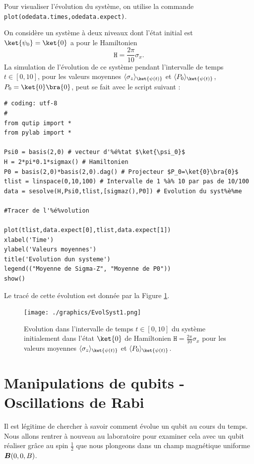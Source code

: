 Pour visualiser l'évolution du système, on utilise la commande 
\texttt{plot(odedata.times,odedata.expect)}.

\begin{example}
On considère un système à deux niveaux dont l'état initial est 
$\ket{\psi_0}=\ket{0}$ a pour le Hamiltonien
\begin{equation}
\mathtt{H} = \frac{2\pi}{10}\sigma_x.
\end{equation}
La simulation de l'évolution de ce système pendant l'intervalle de temps 
$t\in[0,10]$, pour les valeurs moyennes $\av{\sigma_z}_{\ket{\psi(t)}}$ et 
$\av{P_0}_{\ket{\psi(t)}}$, $P_0=\ket{0}\bra{0}$, peut se fait avec le 
script suivant :
\end{example}
\begin{lstlisting}[commentstyle=\scriptsize]
# coding: utf-8 
#
from qutip import *
from pylab import *

Psi0 = basis(2,0) # vecteur d'%é%tat $\ket{\psi_0}$
H = 2*pi*0.1*sigmax() # Hamiltonien
P0 = basis(2,0)*basis(2,0).dag() # Projecteur $P_0=\ket{0}\bra{0}$
tlist = linspace(0,10,100) # Intervalle de 1 %à% 10 par pas de 10/100
data = sesolve(H,Psi0,tlist,[sigmaz(),P0]) # Evolution du syst%è%me

#Tracer de l'%é%volution

plot(tlist,data.expect[0],tlist,data.expect[1])
xlabel('Time')
ylabel('Valeurs moyennes')
title('Evolution dun systeme')
legend(("Moyenne de Sigma-Z", "Moyenne de P0"))
show()
\end{lstlisting}
Le tracé de cette évolution est donnée par la Figure 
\ref{fig:EvolSyst1}.
\begin{figure}[htbp]
\centering
 \texttt{[image: ./graphics/EvolSyst1.png]}
 \caption{Evolution dans l'intervalle de temps $t\in[0,10]$ du système 
initialement dans l'état $\ket{0}$ de Hamiltonien $\mathtt{H} = 
\frac{2\pi}{10}\sigma_x$ pour les valeurs moyennes 
$\av{\sigma_z}_{\ket{\psi(t)}}$ et $\av{P_0}_{\ket{\psi(t)}}$.}
 \label{fig:EvolSyst1}
\end{figure}

\section{Manipulations de qubits - Oscillations de Rabi}
\label{sec:ESpin12}

Il est légitime de chercher à savoir comment évolue un qubit au cours du temps.
Nous allons rentrer à nouveau au laboratoire pour examiner cela avec un qubit
réaliser grâce au spin $\frac{1}{2}$ que nous plongeons dans un champ magnétique
uniforme $\boldsymbol{B}(0,0,B)$.

